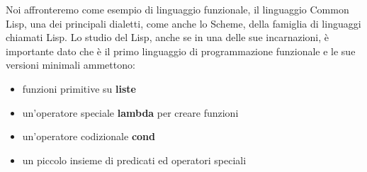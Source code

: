 \documentclass[a4paper]{book}
\begin{document}
Noi affronteremo come esempio di linguaggio funzionale, il linguaggio Common Lisp, una dei principali dialetti, come anche lo Scheme, della famiglia
di linguaggi chiamati Lisp.\newline
Lo studio del Lisp, anche se in una delle sue incarnazioni, è importante dato che è il primo linguaggio di programmazione funzionale e
le sue versioni minimali ammettono:
\begin{itemize}
\item funzioni primitive su \textbf{liste}
\item un'operatore speciale \textbf{lambda} per creare funzioni
\item un'operatore codizionale \textbf{cond}
\item un piccolo insieme di predicati ed operatori speciali
\end{itemize}
\end{document}
